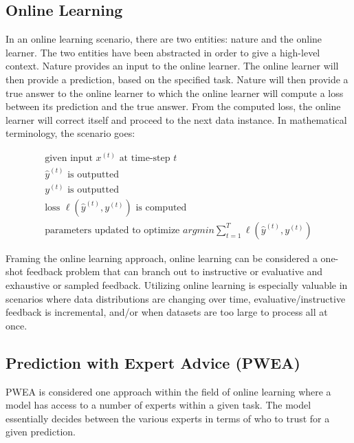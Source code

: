 \documentclass[11pt]{article}
\begin{document}
\subsection{Online Learning}

In an online learning scenario, there are two entities: nature and the online learner. The two entities have been abstracted in order to give a high-level context. Nature provides an input to the online learner. The online learner will then provide a prediction, based on the specified task. Nature will then provide a true answer to the online learner to which the online learner will compute a loss between its prediction and the true answer. From the computed loss, the online learner will correct itself and proceed to the next data instance. In mathematical terminology, the scenario goes:

\begin{gather}
    \text{given input } x^{(t)} \text{ at time-step } t \\
    \hat{y}^{(t)} \text{ is outputted} \\ 
    y^{(t)} \text{ is outputted} \\
    \text{loss } \ell(\hat{y}^{(t)}, y^{(t)}) \text{ is computed} \\
    \text{parameters updated to optimize } argmin \sum_{t=1}^{T}  \ell(\hat{y}^{(t)}, y^{(t)}) 
\end{gather}

Framing the online learning approach, online learning can be considered a one-shot feedback problem that can branch out to instructive or evaluative and exhaustive or sampled feedback. Utilizing online learning is especially valuable in scenarios where data distributions are changing over time, evaluative/instructive feedback is incremental, and/or when datasets are too large to process all at once.

\subsection{Prediction with Expert Advice (PWEA)} \label{ssec:pwea-subsection}

PWEA is considered one approach within the field of online learning where a model has access to a number of experts within a given task. The model essentially decides between the various experts in terms of who to trust for a given prediction\cite{vovk1998game}.
\end{document}
